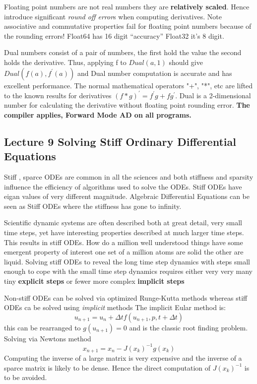 Floating point numbers are not real numbers they are {\bf relatively scaled}. Hence introduce significant  \emph{round off error}s when computing derivatives. Note associative and commutative properties fail for floating point numbers because of the rounding errors! Float64 has 16 digit ``accuracy'' Float32 it's 8 digit.

Dual numbers consist of  a pair of numbers, the first hold the value  the second holds the derivative.
Thus, applying f to $Dual(a, 1)$ should give $Dual(f(a), f^\prime(a))$ and Dual number computation is accurate and has excellent  performance. The normal mathematical operators "+", "*", etc are lifted to the known results for derivatives $(f*g)^\prime = f^\prime g +f g^\prime $. Dual is  a 2-dimensional number for calculating the derivative without floating point rounding error. {\bf The compiler applies, Forward Mode AD on all programs.}

\subsection{Lecture 9 Solving Stiff Ordinary Differential Equations} 
Stiff , sparce ODEs are common in all the sciences and both stiffness and sparsity influence the efficiency of algorithms used to solve the ODEs. Stiff ODEs have eigan values of very different magnitude.
Algebraic Differential Equations can be seen as Stiff ODEs where the stiffness has gone to infinity.

Scientific dynamic systems are often described both at great detail, very small time steps, yet have interesting properties described at much larger time steps. This results in stiff ODEs. How do a million well understood things have some emergent property of interest  one set of a million atoms are solid the other are liquid.  Solving stiff ODEs to reveal the long time step dynamics with steps small enough to cope with the small time step dynamics requires  either very very many tiny {\bf explicit steps} or fewer more complex {\bf implicit steps}

Non-stiff ODEs can be solved via optimized Runge-Kutta methods whereas stiff ODEs ca be solved using \emph{implicit} methods
The implicit Eular method is:
\[u_{n+1} = u_n +\Delta t f(u_{n+1},p,t+\Delta t)\]
this can be rearranged to  $g(u_{n+1})=0$ and is  the classic root finding problem. Solving via Newtons method 
\[x_{n+1} = x_n  -  J(x_k)^{-1}g(x_k)\]
Computing the inverse of a large matrix is very expensive and the inverse of a sparce matrix is likely to be dense. Hence the direct computation of $J(x_k)^{-1}$ is to be avoided.





